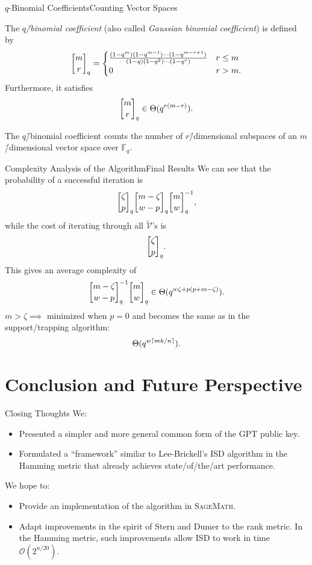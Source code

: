 \documentclass[usepdftitle=false]{beamer}
\newcommand*{\FF}{\ensuremath{\mathbb{F}}}
\newcommand*{\BigOh}{\mathcal{O}}
\DeclarePairedDelimiter{\ceil}{\lceil}{\rceil}
\DeclareRobustCommand{\qbinom}{\genfrac[]{0pt}{}}
\begin{document}
\begin{frame}{\(q\)-Binomial Coefficients}{Counting Vector Spaces}
  \begin{definition}
    The \emph{\(q\)\=/binomial coefficient} (also called
    \emph{Gaussian binomial coefficient}) is defined by
    \[
      \qbinom{m}{r}_q =
      \begin{cases}
        \frac{(1 - q^m) (1 - q^{m - 1}) \cdots (1 - q^{m - r + 1})}{(1 - q) (1 - q^2) \cdots (1 - q^r)} & r \le m\\
        0 & r > m\text.
      \end{cases}
    \]
    Furthermore, it satisfies
    \[
      \qbinom{m}{r}_q \in \Theta(q^{r (m - r)})\text.
    \]
  \end{definition}
  The \(q\)\=/binomial coefficient counts the \alert{number of
    \(r\)\=/dimensional subspaces of an \(m\)\=/dimensional vector
    space over \(\FF_q\)}.
\end{frame}

\begin{frame}{Complexity Analysis of the Algorithm}{Final Results}
  We can see that the probability of a successful iteration is
  \[
    \qbinom{\zeta}{p}_q \qbinom{m - \zeta}{w - p}_q \qbinom{m}{w}_q^{-1}\text,
  \]
  while the cost of iterating through all \(\tilde{\mathcal{V}}\)'s is
  \[
    \qbinom{\zeta}{p}_q\text.
  \]
  This gives an average complexity of
  \[
    \qbinom{m - \zeta}{w - p}_q^{-1} \qbinom{m}{w}_q \in \Theta(q^{w
      \zeta + p (p + m - \zeta)})\text.
  \]
  \(m > \zeta \implies\) minimized when \alert{\(p = 0\)} and becomes
  the same as in the support\-/trapping algorithm:
  \[
    \Theta(q^{w \ceil{m k / {n}}}).
  \]
\end{frame}

\section{Conclusion and Future Perspective}

\begin{frame}{Closing Thoughts}
  We:
  \begin{itemize}
  \item Presented a simpler and more general common form of the GPT
    public key.
  \item Formulated a \enquote{framework} similar to Lee\--Brickell's
    ISD algorithm in the Hamming metric that already achieves
    state\-/of\-/the\-/art performance.
  \end{itemize}
  We hope to:
  \begin{itemize}
  \item Provide an implementation of the algorithm in
    \textsc{SageMath}.
  \item Adapt improvements in the spirit of Stern and Dumer to the
    rank metric.  In the Hamming metric, such improvements allow ISD
    to work in time \(\BigOh(2^{n / {20}})\).
  \end{itemize}
\end{frame}

\begin{frame}[plain, c]
  \addtocounter{framenumber}{-1}
  \begin{center}
    \huge%
  \end{center}
\end{frame}
\end{document}
